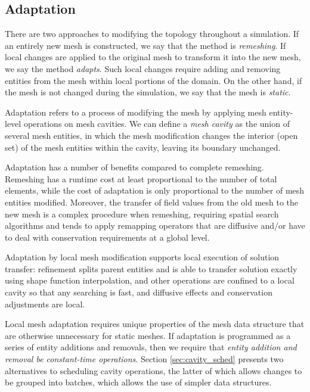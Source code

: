 \subsection{Adaptation}
\label{sec:def_adapt}

There are two approaches to modifying the topology throughout
a simulation.
If an entirely new mesh is constructed, we say that the
method is {\it remeshing}.
If local changes are applied to the original mesh to transform
it into the new mesh, we say the method {\it adapts}.
Such local changes require adding and removing entities
from the mesh within local portions of the domain.
On the other hand, if the mesh is not changed during the
simulation, we say that the mesh is {\it static}.

Adaptation refers to a process of modifying the mesh by applying
mesh entity-level operations on mesh cavities.
We can define a {\it mesh cavity} as the
union of several mesh entities, in which the
mesh modification changes the interior (open set) of
the mesh entities within the cavity, leaving its boundary unchanged.

Adaptation has a number of benefits compared to complete remeshing.
Remeshing has a runtime cost at least proportional to the number
of total elements, while the cost of adaptation is only proportional
to the number of mesh entities modified.
Moreover, the transfer of field values from the old mesh
to the new mesh is a complex procedure when remeshing,
requiring spatial search algorithms and
tends to apply remapping operators that are diffusive and/or
have to deal with conservation requirements at a global level.

Adaptation by local mesh modification supports local execution
of solution transfer: refinement splits
parent entities and is able to transfer solution exactly using
shape function interpolation, and other operations are confined
to a local cavity so that any searching is fast,
and diffusive effects and conservation adjustments are local.

Local mesh adaptation requires unique properties of the
mesh data structure that are otherwise unnecessary for
static meshes.
If adaptation is programmed as a series of entity
additions and removals, then we require that \emph{entity
addition and removal be constant-time operations}.
Section \ref{sec:cavity_sched} presents two alternatives
to scheduling cavity operations, the latter of which
allows changes to be grouped into batches, which allows
the use of simpler data structures.


